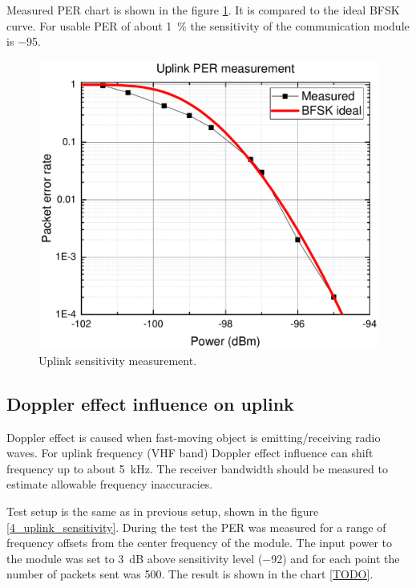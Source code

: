 Measured PER chart is shown in the figure \ref{4_uplink_sensitivity_graph}. It is compared to the ideal BFSK curve. For usable PER of about \SI{1}{\percent} the sensitivity of the communication module is \SI{-95}{\dBm}.

\begin{figure}
    \centering
    \includegraphics[width=0.8\paperwidth]{img/4/uplink_per.pdf}
    \caption{Uplink sensitivity measurement.}
    \label{4_uplink_sensitivity_graph}
\end{figure}


\subsection{Doppler effect influence on uplink}
Doppler effect is caused when fast-moving object is emitting/receiving radio waves. For uplink frequency (VHF band) Doppler effect influence can shift frequency up to about \SI{5}{\kHz}. The receiver bandwidth should be measured to estimate allowable frequency inaccuracies.

Test setup is the same as in previous setup, shown in the figure \ref{4_uplink_sensitivity}. During the test the PER was measured for a range of frequency offsets from the center frequency of the module. The input power to the module was set to \SI{3}{\dB} above sensitivity level (\SI{-92}{\dBm}) and for each point the number of packets sent was \si{500}.  The result is shown in the chart \ref{TODO}.

